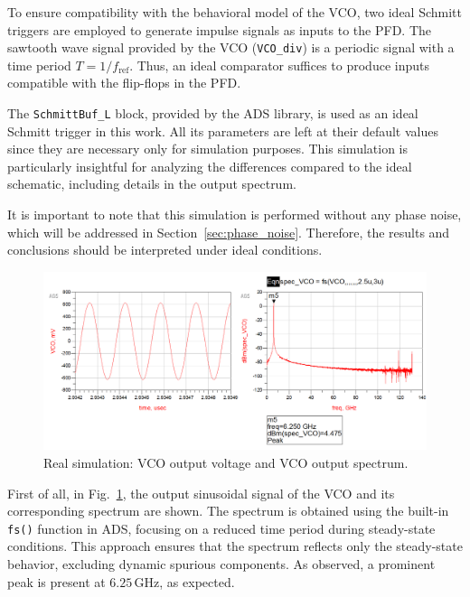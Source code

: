 \documentclass[lettersize,journal]{IEEEtran}
\begin{document}
To ensure compatibility with the behavioral model of the VCO, two ideal Schmitt triggers are employed to generate impulse signals as inputs to the PFD. The sawtooth wave signal provided by the VCO (\texttt{VCO\_div}) is a periodic signal with a time period \(T = 1 / f_{\text{ref}}\). Thus, an ideal comparator suffices to produce inputs compatible with the flip-flops in the PFD. 

The \texttt{SchmittBuf\_L} block, provided by the ADS library, is used as an ideal Schmitt trigger in this work. All its parameters are left at their default values since they are necessary only for simulation purposes. This simulation is particularly insightful for analyzing the differences compared to the ideal schematic, including details in the output spectrum.

It is important to note that this simulation is performed without any phase noise, which will be addressed in Section~\ref{sec:phase_noise}. Therefore, the results and conclusions should be interpreted under ideal conditions.

\begin{figure}[!ht]
    \centering
    \includegraphics[width=1\linewidth]{images/ads_results/real_pll/vco_out_real_results.png}
    \caption{Real simulation: VCO output voltage and VCO output spectrum.}
    \label{fig:vco_out_real_results}
\end{figure}

First of all, in Fig.~\ref{fig:vco_out_real_results}, the output sinusoidal signal of the VCO and its corresponding spectrum are shown. The spectrum is obtained using the built-in \texttt{fs()} function in ADS, focusing on a reduced time period during steady-state conditions. This approach ensures that the spectrum reflects only the steady-state behavior, excluding dynamic spurious components. As observed, a prominent peak is present at \(6.25 \, \text{GHz}\), as expected.
\end{document}
